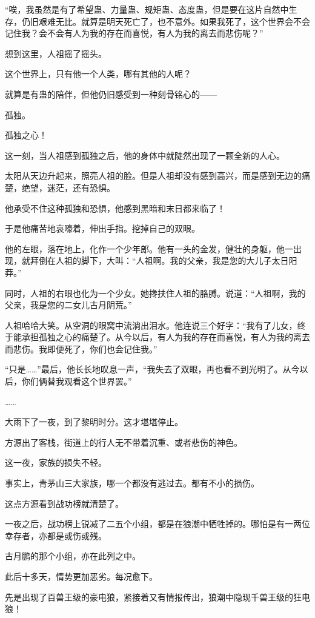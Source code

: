 \begin{this_body}
“唉，我虽然是有了希望蛊、力量蛊、规矩蛊、态度蛊，但是要在这片自然中生存，仍旧艰难无比。就算是明天死亡了，也不意外。如果我死了，这个世界会不会记住我？会不会有人为我的存在而喜悦，有人为我的离去而悲伤呢？”

想到这里，人祖摇了摇头。

这个世界上，只有他一个人类，哪有其他的人呢？

就算是有蛊的陪伴，但他仍旧感受到一种刻骨铭心的——

孤独。

孤独之心！

这一刻，当人祖感到孤独之后，他的身体中就陡然出现了一颗全新的人心。

太阳从天边升起来，照亮人祖的脸。但是人祖却没有感到高兴，而是感到无边的痛楚，绝望，迷茫，还有恐惧。

他承受不住这种孤独和恐惧，他感到黑暗和末日都来临了！

于是他痛苦地哀嚎着，伸出手指。挖掉自己的双眼。

他的左眼，落在地上，化作一个少年郎。他有一头的金发，健壮的身躯，他一出现，就拜倒在人祖的脚下，大叫：“人祖啊。我的父亲，我是您的大儿子太日阳莽。”

同时，人祖的右眼也化为一个少女。她搀扶住人祖的胳膊。说道：“人祖啊，我的父亲，我是您的二女儿古月阴荒。”

人祖哈哈大笑。从空洞的眼窝中流淌出泪水。他连说三个好字：“我有了儿女，终于能承担孤独之心的痛楚了。从今以后，有人为我的存在而喜悦，有人为我的离去而悲伤。我即便死了，你们也会记住我。”

“只是……”最后，他长长地叹息一声，“我失去了双眼，再也看不到光明了。从今以后，你们俩替我观看这个世界罢。”

……

大雨下了一夜，到了黎明时分。这才堪堪停止。

方源出了客栈，街道上的行人无不带着沉重、或者悲伤的神色。

这一夜，家族的损失不轻。

事实上，青茅山三大家族，哪一个都没有逃过去。都有不小的损伤。

这点方源看到战功榜就清楚了。

一夜之后，战功榜上锐减了二五个小组，都是在狼潮中牺牲掉的。哪怕是有一两位幸存者，亦都是或伤或残。

古月鹏的那个小组，亦在此列之中。

此后十多天，情势更加恶劣。每况愈下。

先是出现了百兽王级的豪电狼，紧接着又有情报传出，狼潮中隐现千兽王级的狂电狼！


\end{this_body}
